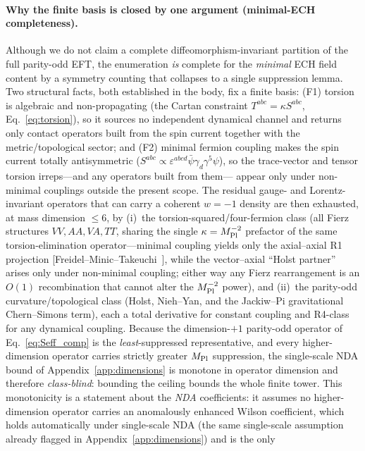\documentclass[aps,prd,twocolumn,superscriptaddress,showpacs,preprintnumbers,nofootinbib,longbibliography,floatfix]{revtex4-2}
\begin{document}
\paragraph{Why the finite basis is closed by one argument (minimal-ECH
completeness).} Although we do not claim a complete diffeomorphism-invariant
partition of the full parity-odd EFT, the enumeration \emph{is} complete for the
\emph{minimal} ECH field content by a symmetry counting that collapses to a
single suppression lemma. Two structural facts, both established in the body,
fix a finite basis: (F1) torsion is algebraic and non-propagating (the Cartan
constraint $T^{abc}=\kappa S^{abc}$, Eq.~\eqref{eq:torsion}), so it sources no
independent dynamical channel and returns only contact operators built from the
spin current together with the metric/topological sector; and (F2) minimal
fermion coupling makes the spin current totally antisymmetric
($S^{abc}\propto\varepsilon^{abcd}\bar\psi\gamma_d\gamma^5\psi$), so the
trace-vector and tensor torsion irreps---and any operators built from them---
appear only under non-minimal couplings outside the present scope. The residual
gauge- and Lorentz-invariant operators that can carry a coherent $w=-1$ density
are then exhausted, at mass dimension $\le 6$, by (i)~the
torsion-squared/four-fermion class (all Fierz structures $VV,AA,VA,TT$, sharing
the single $\kappa=M_{\rm Pl}^{-2}$ prefactor of the same torsion-elimination
operator---minimal coupling yields only the axial--axial R1 projection
[Freidel--Minic--Takeuchi~\cite{Freidel2005}], while the vector--axial
``Holst partner'' arises only under non-minimal coupling; either way any Fierz
rearrangement is an $O(1)$ recombination that cannot alter the $M_{\rm
Pl}^{-2}$ power), and (ii)~the parity-odd curvature/topological class (Holst,
Nieh--Yan, and the Jackiw--Pi gravitational Chern--Simons term), each a total
derivative for constant coupling and R4-class for any dynamical coupling.
Because the dimension-$+1$ parity-odd operator of Eq.~\eqref{eq:Seff_comp} is
the \emph{least}-suppressed representative, and every higher-dimension operator
carries strictly greater $M_{\rm Pl}$ suppression, the single-scale NDA bound of
Appendix~\ref{app:dimensions} is monotone in operator dimension and therefore
\emph{class-blind}: bounding the ceiling bounds the whole finite tower. This
monotonicity is a statement about the \emph{NDA} coefficients: it assumes no
higher-dimension operator carries an anomalously enhanced Wilson coefficient,
which holds automatically under single-scale NDA (the same single-scale
assumption already flagged in Appendix~\ref{app:dimensions}) and is the only
\end{document}
